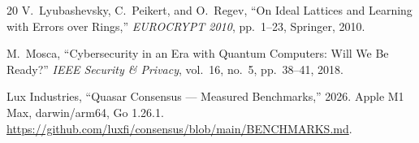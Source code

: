 \begin{thebibliography}{20}
V.~Lyubashevsky, C.~Peikert, and O.~Regev, ``On Ideal Lattices and Learning with
Errors over Rings,'' \emph{EUROCRYPT 2010}, pp.~1--23, Springer, 2010.

M.~Mosca, ``Cybersecurity in an Era with Quantum Computers: Will We Be Ready?''
\emph{IEEE Security \& Privacy}, vol.~16, no.~5, pp.~38--41, 2018.

Lux Industries, ``Quasar Consensus --- Measured Benchmarks,'' 2026. Apple M1 Max, darwin/arm64, Go 1.26.1. \url{https://github.com/luxfi/consensus/blob/main/BENCHMARKS.md}.

\end{thebibliography}

